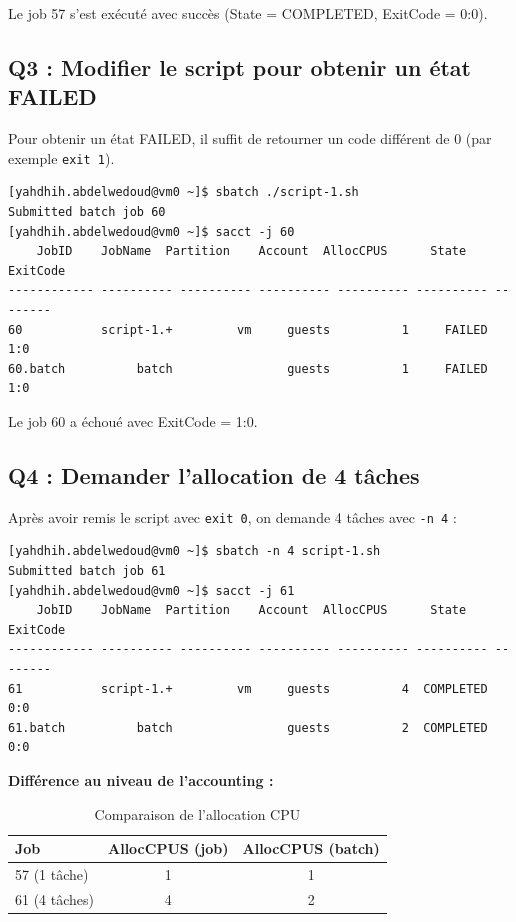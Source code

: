 \documentclass[12pt,a4paper]{article}
\newcommand{\code}[1]{\texttt{#1}}
\begin{document}
Le job 57 s'est exécuté avec succès (State = COMPLETED, ExitCode = 0:0).

\subsection{Q3 : Modifier le script pour obtenir un état FAILED}

Pour obtenir un état FAILED, il suffit de retourner un code différent de 0 (par exemple \code{exit 1}).

\begin{lstlisting}
[yahdhih.abdelwedoud@vm0 ~]$ sbatch ./script-1.sh
Submitted batch job 60
[yahdhih.abdelwedoud@vm0 ~]$ sacct -j 60
    JobID    JobName  Partition    Account  AllocCPUS      State ExitCode
------------ ---------- ---------- ---------- ---------- ---------- --------
60           script-1.+         vm     guests          1     FAILED      1:0
60.batch          batch                guests          1     FAILED      1:0
\end{lstlisting}

Le job 60 a échoué avec ExitCode = 1:0.

\subsection{Q4 : Demander l'allocation de 4 tâches}

Après avoir remis le script avec \code{exit 0}, on demande 4 tâches avec \code{-n 4} :

\begin{lstlisting}
[yahdhih.abdelwedoud@vm0 ~]$ sbatch -n 4 script-1.sh
Submitted batch job 61
[yahdhih.abdelwedoud@vm0 ~]$ sacct -j 61
    JobID    JobName  Partition    Account  AllocCPUS      State ExitCode
------------ ---------- ---------- ---------- ---------- ---------- --------
61           script-1.+         vm     guests          4  COMPLETED      0:0
61.batch          batch                guests          2  COMPLETED      0:0
\end{lstlisting}

\textbf{Différence au niveau de l'accounting :}

\begin{table}[h]
\centering
\begin{tabular}{|l|c|c|}
\hline
\textbf{Job} & \textbf{AllocCPUS (job)} & \textbf{AllocCPUS (batch)} \\
\hline
57 (1 tâche) & 1 & 1 \\
61 (4 tâches) & 4 & 2 \\
\hline
\end{tabular}
\caption{Comparaison de l'allocation CPU}
\end{table}
\end{document}
